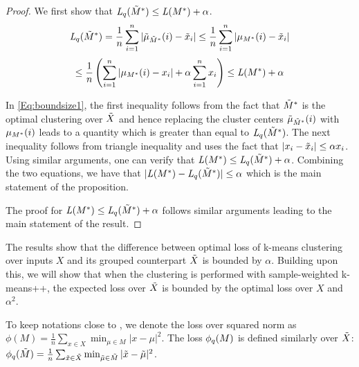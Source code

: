 \begin{proof} We first show that $\mathit{L}_q(\tilde{M}^{*}) \leq \mathit{L}(M^{*}) + \alpha$.
   \[
   \mathit{L}_q(\tilde{M}^{*}) = \frac{1}{n} \sum_{i=1}^n |\tilde{\mu}_{\tilde{M}^{*}}(i) - \tilde{x}_{i}| \leq \frac{1}{n} \sum_{i=1}^n |\mu_{M^{*}}(i) - \tilde{x}_{i}| 
   \]
   \begin{equation}\label{Eq:boundsize1}
   \leq \frac{1}{n} \left ( \sum_{i=1}^n |\mu_{M^{*}}(i) - x_i| + \alpha \sum_{i=1}^n x_i \right) \leq \mathit{L}(M^{*}) + \alpha
   \end{equation}

In \cref{Eq:boundsize1}, the first inequality follows from the fact that $\tilde{M}^{*}$ is the optimal clustering over $\tilde{X}$ and hence replacing the cluster centers $\tilde{\mu}_{\tilde{M}^{*}}(i)$ with $\mu_{M^{*}}(i)$ leads to a quantity which is greater than equal to $\mathit{L}_q(\tilde{M}^{*})$. The next inequality follows from triangle inequality and uses the fact that $|x_i - \tilde{x}_{i}| \leq \alpha x_i$. Using similar arguments, one can verify that $\mathit{L}(M^{*}) \leq \mathit{L}_q(\tilde{M}^{*})  + \alpha$. Combining the two equations, we have that $|\mathit{L}(M^{*}) - \mathit{L}_q(\tilde{M}^{*})| \leq \alpha$ which is the main statement of the proposition.

The proof for $\mathit{L}(M^{*}) \leq \mathit{L}_q(\tilde{M}^{*})  + \alpha$ follows similar arguments leading to the main statement of the result.


\end{proof}

\begin{remark} The results show that the difference between optimal loss of k-means clustering over inputs $X$ and its grouped counterpart $\tilde{X}$ is bounded by $\alpha$. Building upon this, we will show that when the clustering is performed with sample-weighted k-means++, the expected loss over $\tilde{X}$ is bounded by the optimal loss over $X$ and $\alpha^2$. 
\end{remark}


To keep notations close to \cite{kmeanspp}, we denote the loss over squared norm as $\phi(M) = \frac{1}{n}\sum_{x \in X} \min_{\mu \in M} |x - \mu|^2$. The loss $\phi_q(M)$ is defined similarly over $\tilde{X}$: $\phi_q(\tilde{M}) = \frac{1}{n}\sum_{\tilde{x} \in \tilde{X}} \min_{\tilde{\mu} \in \tilde{M}} |\tilde{x} - \tilde{\mu}|^2$. 

